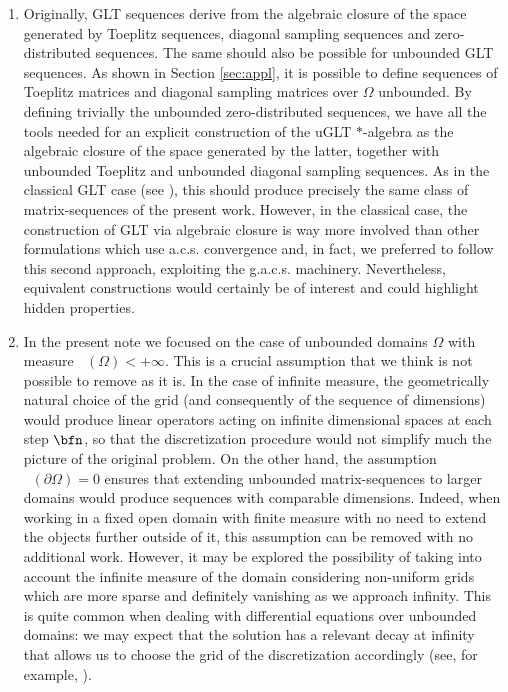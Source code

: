\documentclass{amsart}
\DeclareMathOperator{\Ld}{\mathcal{L}^d}
\begin{document}
\begin{enumerate}
    \item[(a)] Originally, GLT sequences derive from the algebraic closure of the space generated by Toeplitz sequences, diagonal sampling sequences and zero-distributed sequences. The same should also be possible for unbounded GLT sequences. As shown in Section \ref{sec:appl}, it is possible to define sequences of Toeplitz matrices and diagonal sampling matrices over $\Omega$ unbounded. By defining trivially the unbounded zero-distributed sequences, we have all the tools needed for an explicit construction of the uGLT $*$-algebra as the algebraic closure of the space generated by the latter, together with unbounded Toeplitz and unbounded diagonal sampling sequences. As in the classical GLT case (see \cite{applications-axioms,glt-laa}), this should produce precisely the same class of matrix-sequences of the present work. However, in the classical case, the construction of GLT via algebraic closure is way more involved than other formulations which use a.c.s. convergence and, in fact, we preferred to follow this second approach, exploiting the g.a.c.s. machinery. Nevertheless, equivalent constructions would certainly be of interest and could highlight hidden properties.
    \item[(b)] In the present note we focused on the case of unbounded domains $\Omega$ with measure $\Ld(\Omega) < +\infty$. This is a crucial assumption that we think is not possible to remove as it is. In the case of infinite measure, the geometrically natural choice of the grid (and consequently of the sequence of dimensions) would produce linear operators acting on infinite dimensional spaces at each step $\bfn$, so that the discretization procedure would not simplify much the picture of the original problem. On the other hand, the assumption $\Ld(\partial\Omega)=0$ ensures that extending unbounded matrix-sequences to larger domains would produce sequences with comparable dimensions. Indeed, when working in a fixed open domain with finite measure with no need to extend the objects further outside of it, this assumption can be removed with no additional work. However, it may be explored the possibility of taking into account the infinite measure of the domain considering non-uniform grids which are more sparse and definitely vanishing as we approach infinity. This is quite common when dealing with differential equations over unbounded domains: we may expect that the solution has a relevant decay at infinity that allows us to choose the grid of the discretization accordingly (see, for example, \cite{ABKST26,dT14}).

\end{enumerate}
\end{document}

